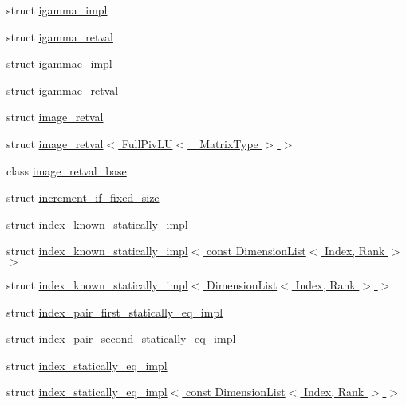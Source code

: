\begin{DoxyCompactItemize}
struct \hyperlink{struct_eigen_1_1internal_1_1igamma__impl}{igamma\+\_\+impl}
\item 
struct \hyperlink{struct_eigen_1_1internal_1_1igamma__retval}{igamma\+\_\+retval}
\item 
struct \hyperlink{struct_eigen_1_1internal_1_1igammac__impl}{igammac\+\_\+impl}
\item 
struct \hyperlink{struct_eigen_1_1internal_1_1igammac__retval}{igammac\+\_\+retval}
\item 
struct \hyperlink{struct_eigen_1_1internal_1_1image__retval}{image\+\_\+retval}
\item 
struct \hyperlink{struct_eigen_1_1internal_1_1image__retval_3_01_full_piv_l_u_3_01___matrix_type_01_4_01_4}{image\+\_\+retval$<$ Full\+Piv\+L\+U$<$ \+\_\+\+Matrix\+Type $>$ $>$}
\item 
class \hyperlink{struct_eigen_1_1internal_1_1image__retval__base}{image\+\_\+retval\+\_\+base}
\item 
struct \hyperlink{struct_eigen_1_1internal_1_1increment__if__fixed__size}{increment\+\_\+if\+\_\+fixed\+\_\+size}
\item 
struct \hyperlink{struct_eigen_1_1internal_1_1index__known__statically__impl}{index\+\_\+known\+\_\+statically\+\_\+impl}
\item 
struct \hyperlink{struct_eigen_1_1internal_1_1index__known__statically__impl_3_01const_01_dimension_list_3_01_index_00_01_rank_01_4_01_4}{index\+\_\+known\+\_\+statically\+\_\+impl$<$ const Dimension\+List$<$ Index, Rank $>$ $>$}
\item 
struct \hyperlink{struct_eigen_1_1internal_1_1index__known__statically__impl_3_01_dimension_list_3_01_index_00_01_rank_01_4_01_4}{index\+\_\+known\+\_\+statically\+\_\+impl$<$ Dimension\+List$<$ Index, Rank $>$ $>$}
\item 
struct \hyperlink{struct_eigen_1_1internal_1_1index__pair__first__statically__eq__impl}{index\+\_\+pair\+\_\+first\+\_\+statically\+\_\+eq\+\_\+impl}
\item 
struct \hyperlink{struct_eigen_1_1internal_1_1index__pair__second__statically__eq__impl}{index\+\_\+pair\+\_\+second\+\_\+statically\+\_\+eq\+\_\+impl}
\item 
struct \hyperlink{struct_eigen_1_1internal_1_1index__statically__eq__impl}{index\+\_\+statically\+\_\+eq\+\_\+impl}
\item 
struct \hyperlink{struct_eigen_1_1internal_1_1index__statically__eq__impl_3_01const_01_dimension_list_3_01_index_00_01_rank_01_4_01_4}{index\+\_\+statically\+\_\+eq\+\_\+impl$<$ const Dimension\+List$<$ Index, Rank $>$ $>$}

\end{DoxyCompactItemize}
